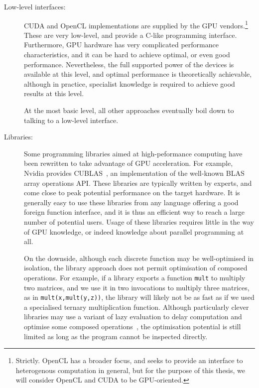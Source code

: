 \begin{description}
\item[Low-level interfaces:] CUDA and OpenCL implementations are
  supplied by the GPU vendors.\footnote{Strictly. OpenCL has a broader
    focus, and seeks to provide an interface to heterogenous
    computation in general, but for the purpose of this thesis, we
    will consider OpenCL and CUDA to be GPU-oriented.}  These are very
  low-level, and provide a C-like programming interface.  Furthermore,
  GPU hardware has very complicated performance characteristics, and
  it can be hard to achieve optimal, or even good performance.
  Nevertheless, the full supported power of the devices is available
  at this level, and optimal performance is theoretically achievable,
  although in practice, specialist knowledge is required to achieve
  good results at this level.

  At the most basic level, all other approaches eventually boil down
  to talking to a low-level interface.

\item[Libraries:] Some programming libraries aimed at high-peformance
  computing have been rewritten to take advantage of GPU acceleration.
  For example, Nvidia provides CUBLAS~\cite{nvidia2008cublas}, an
  implementation of the well-known BLAS array operations API.  These
  libraries are typically written by experts, and come close to peak
  potential performance on the target hardware.  It is generally easy
  to use these libraries from any language offering a good foreign
  function interface, and it is thus an efficient way to reach a large
  number of potential users.  Usage of these libraries requires little
  in the way of GPU knowledge, or indeed knowledge about parallel
  programming at all.

  On the downside, although each discrete function may be
  well-optimised in isolation, the library approach does not permit
  optimisation of composed operations.  For example, if a library
  exports a function \texttt{mult} to multiply two matrices, and we
  use it in two invocations to multiply three matrices, as in
  \texttt{mult(x,mult(y,z))}, the library will likely not be as fast
  as if we used a specialised ternary multiplication function.
  Although particularly clever libraries may use a variant of lazy
  evaluation to delay computation and optimise some composed
  operations~\cite{kristensenbohrium}, the optimisation potential is
  still limited as long as the program cannot be inspected directly.


\end{description}

